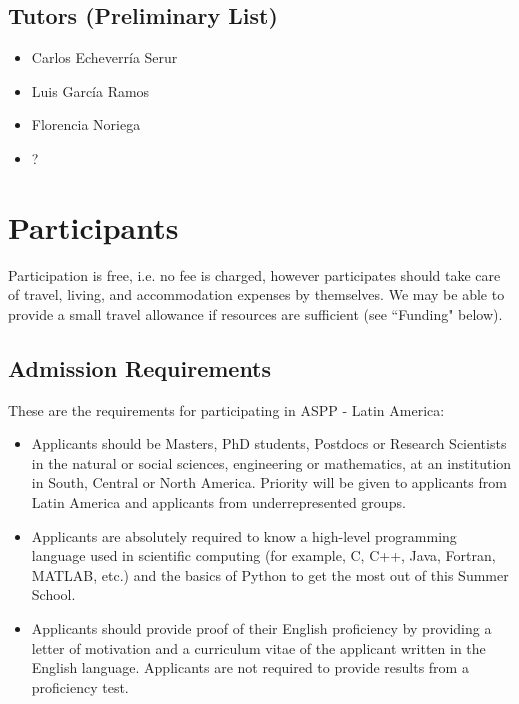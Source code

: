 \documentclass{article}[11pt]
\begin{document}
\subsection*{Tutors (Preliminary List)}
\begin{itemize}
    \item Carlos Echeverr\'ia Serur
    \item Luis Garc\'ia Ramos
    \item Florencia Noriega
    \item ?
\end{itemize}

\section*{Participants}
Participation is free, i.e. no fee is charged, however participates should take care of travel, living, and accommodation expenses by themselves.
We may be able to provide a small travel allowance if resources are sufficient (see ``Funding" below).

\pagebreak

\subsection*{Admission Requirements}
These are the requirements for participating in ASPP - Latin America:
\begin{itemize}

    \item Applicants should be Masters, PhD students, Postdocs or Research Scientists in the natural or social sciences, engineering or mathematics, at an institution in South, Central or North America. Priority will be given to applicants from Latin America and applicants from underrepresented groups.
    \item Applicants are absolutely required to know a high-level programming language used in scientific computing (for example, C, C++, Java, Fortran, MATLAB, etc.) and the basics of Python to get the most out of this Summer School.
    \item Applicants should provide proof of their English proficiency by providing a letter of motivation and a curriculum vitae of the applicant written in the English language. Applicants are not required to provide results from a proficiency test.  
    \end{itemize}
\end{document}
